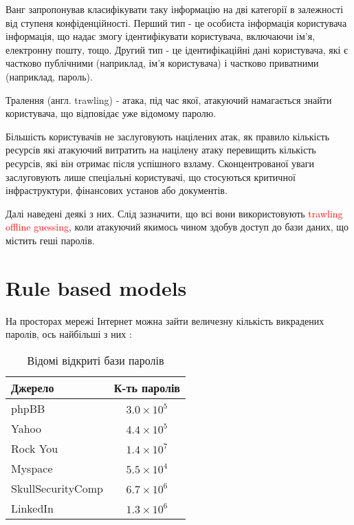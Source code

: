 Ванг \cite{Targeted online password guessing} запропонував класифікувати таку інформацію на дві категорії в залежності від ступеня конфіденційності. Перший тип - це особиста інформація користувача інформація, що надає змогу ідентифікувати користувача, включаючи ім'я, електронну пошту, тощо. Другий тип - це ідентифікаційні дані користувача, які є частково публічними (наприклад, ім'я користувача) і частково приватними (наприклад, пароль).

\begin{definition}
Тралення (англ. trawling) - атака, під час якої, атакуючий намагається знайти користувача, що відповідає уже відомому паролю.
\end{definition}

\begin{definition}
Більшість користувачів не заслуговують націлених атак, як правило кількість ресурсів які атакуючий витратить на націлену атаку перевищить кількість ресурсів, які він отримає після успішного взламу. Сконцентрованої уваги заслуговують лише спеціальні користувачі, що стосуються критичної інфраструктури, фінансових установ або документів.    
\end{definition}

Далі наведені деякі з них. Слід зазначити, що всі вони використовують \textcolor{red}{trawling offline guessing}, коли атакуючий якимось чином здобув доступ до бази даних, що містить геші паролів.

\section{Rule based models}
На просторах мережі Інтернет можна зайти величезну кількість викрадених паролів, ось найбільші з них \cite{GNPassGAN}:

\begin{table}[h]
\centering
\begin{tabular}{|l|c|}
\hline
\textbf{Джерело} & \textbf{К-ть паролів} \\
\hline
phpBB & $3.0 \times 10^5$ \\
Yahoo & $4.4 \times 10^5$ \\
Rock You & $1.4 \times 10^7$ \\
Myspace & $5.5 \times 10^4$ \\
SkullSecurityComp & $6.7 \times 10^6$ \\
LinkedIn & $1.3 \times 10^6$ \\
\hline
\end{tabular}
\caption{Відомі відкриті бази паролів}
\end{table}

